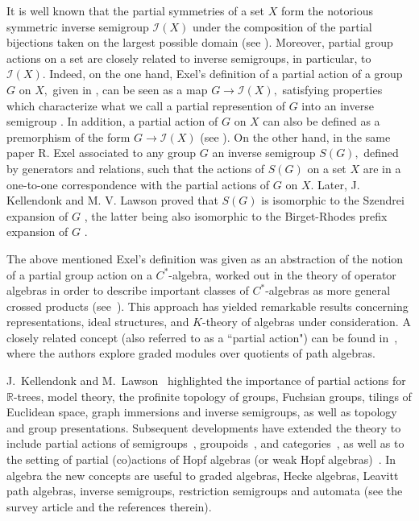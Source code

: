 \documentclass{amsart}
\newcommand{\0}{{\vartheta}}
\theoremstyle{definition}
\theoremstyle{remark}
\numberwithin{equation}{section}
\newtheorem*{Theorem A}{\textbf{Theorem A}}
\newtheorem*{Corollary E}{\textbf{Corollary E}}
\newtheorem*{Corollary F}{\textbf{Corollary F}}
\newtheorem*{Theorem B}{\textbf{Theorem B}}
\newtheorem*{Theorem C}{\textbf{Theorem C}}
\newtheorem*{Theorem D}{\textbf{Theorem B}}
\newtheorem*{p a}{\textbf{Proof of  Theorem A}}
\newtheorem*{p b}{\textbf{Proof of Theorem B}}
\newtheorem*{p c}{\textbf{Proof of  Theorem C}}
\newtheorem*{p d}{\textbf{Proof of  Theorem D}}
\begin{document}
 It is well known that  the  partial symmetries of a  set $X$ form the notorious  symmetric inverse semigroup ${\mathcal I}(X)$  under the composition of the partial bijections taken on the largest possible domain (see \cite{Lawson}). Moreover,  partial group actions on  a set are closely related to inverse semigroups, in particular, to ${\mathcal I}(X).$   Indeed, on the one hand,  Exel's definition of a partial action of a group $G$ on $X,$ given in  \cite[Definition 1.2]{Exel1998}, can be seen as a
  map $G\to {\mathcal I}(X),$ satisfying properties which characterize what we call a partial represention of $G$ into an inverse semigroup \cite[Proposition 4.1]{Exel1998}. In addition, a partial action of $G$ on $X$ can also be defined as a  premorphism of the form $G \to {\mathcal I}(X)$ (see  \cite[Proposition 2.1]{KL}).
  On the other hand, in the same paper \cite{Exel1998}  R. Exel associated to any group $G$ an inverse semigroup $S(G),$  defined by generators and relations, such that the actions of $S(G)$ on a set $X$ are  in a one-to-one correspondence  with the partial actions of $G$ on $X.$ Later,  J. Kellendonk and   M. V. Lawson \cite{KL} proved that $S(G)$  is isomorphic to the Szendrei expansion of $G$ \cite{Szendrei},  the latter being also isomorphic to the Birget-Rhodes prefix expansion of $G$  \cite{BR2}.

The above mentioned  Exel's definition was given as an abstraction of the notion of a partial group action    on a $C^*$-algebra, worked out in the theory of operator algebras in order to  describe important classes of $C^*$-algebras as more general crossed products (see~\cite{exel1994,Mc,E0}). This approach has yielded remarkable results concerning  representations, ideal structures, and $K$-theory of algebras under consideration. A closely related concept (also referred to as a ``partial action") can be found in~\cite{GreenMarcos}, where the authors explore graded modules over quotients of path algebras. 

J.~Kellendonk and M.~Lawson~\cite{Lawson} highlighted the  importance of partial actions for $\mathbb{R}$-trees, model theory, the profinite topology of groups, Fuchsian groups, tilings of Euclidean space, graph immersions and inverse semigroups, as well as topology and group presentations.  Subsequent developments  have extended the theory  to include partial actions of semigroups~\cite{Megre2,Hol1,GouHol1,CornGould,Kud,
Khry1,KudLaan2}, groupoids~\cite{Gilbert,BP,CaenFier,NysOinPin,MaPi}, and categories~\cite{Nystedt}, as well as to the setting of partial   (co)actions of Hopf algebras (or weak Hopf algebras)~\cite{CaenJan,AB3,ABV,CasPaqQuaSant,
BatiVerc1,HuVerc,AzMaPaSi,BaHaSaVe}.
In algebra the new concepts are   useful   to graded algebras,   Hecke algebras,   Leavitt path algebras,  
  inverse semigroups,  restriction  semigroups  and automata (see the survey article \cite{dokuchaev2019} and the references therein). 
  
\end{document}
